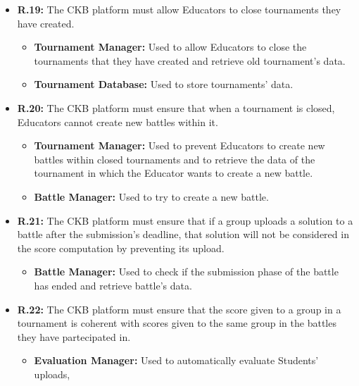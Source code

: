 \documentclass{article}
\begin{document}
{\begin{itemize}
\begin{itemize}
              \item \textbf{Tournament Manager:} Used to check if the characteristics of the tournaments
              that the Educator wants to create respect some constraints.
          \end{itemize}
    \item \textbf{R.19:} The CKB platform must allow Educators to close tournaments they have created.
          \begin{itemize}
              \item \textbf{Tournament Manager:} Used to allow Educators to close the tournaments that they have
              created and retrieve old tournament's data.
              \item \textbf{Tournament Database:} Used to store tournaments' data.
          \end{itemize}
    \item \textbf{R.20:} The CKB platform must ensure that when a tournament is closed, Educators cannot create new battles
          within it.
          \begin{itemize}
              \item \textbf{Tournament Manager:} Used to prevent Educators to create new battles
                within closed tournaments and to retrieve the data of the tournament in which
                the Educator wants to create a new battle.
            \item \textbf{Battle Manager:} Used to try to create a new battle.
          \end{itemize}
    \item \textbf{R.21:} The CKB platform must ensure that if a group uploads a solution to a battle after the submission's deadline,
          that solution will not be considered in the score computation by preventing its upload.
          \begin{itemize}
              \item \textbf{Battle Manager:} Used to check if the submission phase of the battle has ended and
              retrieve battle's data. 
          \end{itemize}
    \item \textbf{R.22:} The CKB platform must ensure that the score given to a group in a tournament is
          coherent with scores given to the same group in the battles they have partecipated in.
          \begin{itemize}
              \item \textbf{Evaluation Manager:} Used to automatically evaluate Students' uploads,

\end{itemize}
\end{itemize}}
\end{document}
